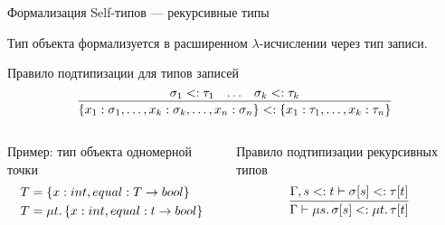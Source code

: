 \documentclass[handout,aspectratio=169,usenames,dvipsnames]{beamer}
\begin{document}
    \begin{frame}[fragile]{Формализация Self-типов --- рекурсивные типы}

        Тип объекта формализуется в расширенном $\lambda$-исчислении через тип записи.
        \begin{block}{Правило подтипизации для типов записей}
            \[
                \infer{
                    \{x_1 : \sigma_1, \ldots, x_k : \sigma_k, \ldots, x_n : \sigma_n\}
                    <:
                    \{x_1 : \tau_1, \ldots, x_k : \tau_n\}
                }{\sigma_1 <: \tau_1 & \ldots & \sigma_k <: \tau_k}
            \]
        \end{block}

        \pause

        \vspace{-1em}
        \begin{columns}[onlytextwidth]
            \begin{column}[t]{0.485\textwidth}
                \begin{block}{Пример: тип объекта одномерной точки}
                    \vspace{-1.2em}
                    \begin{align*}
                        T &= \{ x : int, equal : T \to bool \} \\
                        T &= \mu t \ldotp \{ x : int, equal : t \to bool \}
                    \end{align*}
                \end{block}
            \end{column}\hfill%
            \begin{column}[t]{0.485\textwidth}
                \begin{block}{Правило подтипизации рекурсивных типов}
                    \begin{equation*}
                        \infer{
                            \Gamma \vdash \mu s\ldotp \sigma[s] <: \mu t\ldotp \tau[t]
                        }{
                            \Gamma, s <: t \vdash \sigma[s] <: \tau[t]
                        }
                    \end{equation*}
                \end{block}
            \end{column}
        \end{columns}

        \pause


\end{frame}
\end{document}
